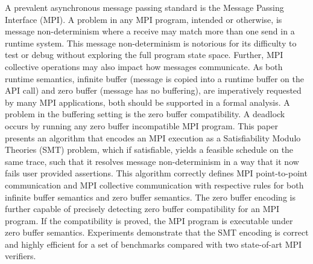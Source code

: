 %
A prevalent asynchronous message passing standard is the Message Passing Interface (MPI).
%
A problem in any MPI program, intended or otherwise, is message non-determinism where a receive may match more than one send in a runtime system.
%
This message non-determinism is notorious for its difficulty to test or debug without exploring the full program state space. 
%
Further, MPI collective operations may also impact how messages communicate.
%
As both runtime semantics, infinite buffer (message is copied into a runtime buffer on the API call) and zero buffer (message has no buffering), are imperatively requested by many MPI applications, both should be supported in a formal analysis.
%
A  problem in the buffering setting is the zero buffer compatibility. A deadlock occurs by running any zero buffer incompatible MPI program.
%
This paper presents an algorithm that encodes an MPI execution as a Satisfiability Modulo Theories (SMT) problem, which if satisfiable, yields a feasible schedule on the same trace, such that it resolves message non-determinism in a way that it now fails user provided assertions.
%
This algorithm correctly defines MPI point-to-point communication and MPI collective communication with respective rules for both infinite buffer semantics and zero buffer semantics. 
%
The zero buffer encoding is further capable of precisely detecting zero buffer compatibility for an MPI program. 
%
If the compatibility is proved, the MPI program is executable under zero buffer semantics.
%
Experiments demonstrate that the SMT encoding is correct and highly efficient for a set of benchmarks compared with two state-of-art MPI verifiers. 
%
